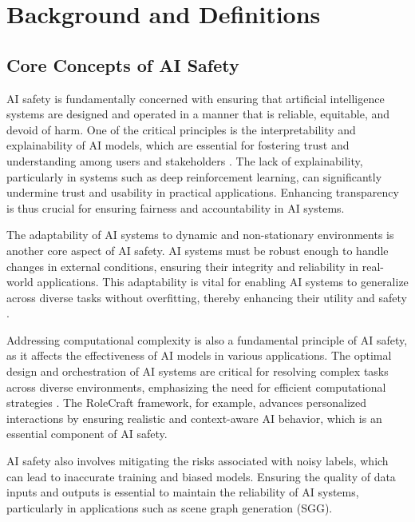 \section{Background and Definitions} \label{sec:Background and Definitions}



\subsection{Core Concepts of AI Safety} \label{subsec:Core Concepts of AI Safety}

AI safety is fundamentally concerned with ensuring that artificial intelligence systems are designed and operated in a manner that is reliable, equitable, and devoid of harm. One of the critical principles is the interpretability and explainability of AI models, which are essential for fostering trust and understanding among users and stakeholders \cite{lin2023interpretabilityframeworksimilarcase}. The lack of explainability, particularly in systems such as deep reinforcement learning, can significantly undermine trust and usability in practical applications. Enhancing transparency is thus crucial for ensuring fairness and accountability in AI systems.



The adaptability of AI systems to dynamic and non-stationary environments is another core aspect of AI safety. AI systems must be robust enough to handle changes in external conditions, ensuring their integrity and reliability in real-world applications. This adaptability is vital for enabling AI systems to generalize across diverse tasks without overfitting, thereby enhancing their utility and safety \cite{kaur2024cropcontextwiserobuststatic}. 



Addressing computational complexity is also a fundamental principle of AI safety, as it affects the effectiveness of AI models in various applications. The optimal design and orchestration of AI systems are critical for resolving complex tasks across diverse environments, emphasizing the need for efficient computational strategies \cite{stogin2022provablystableneuralnetwork}. The RoleCraft framework, for example, advances personalized interactions by ensuring realistic and context-aware AI behavior, which is an essential component of AI safety.



AI safety also involves mitigating the risks associated with noisy labels, which can lead to inaccurate training and biased models. Ensuring the quality of data inputs and outputs is essential to maintain the reliability of AI systems, particularly in applications such as scene graph generation (SGG).



